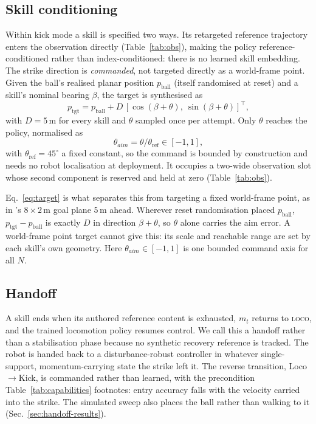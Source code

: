 \documentclass[letterpaper, 10 pt, conference]{ieeeconf}  %
\begin{document}
\subsection{Skill conditioning}

Within kick mode a skill is specified two ways. Its retargeted reference
trajectory enters the observation directly (Table~\ref{tab:obs}), making the
policy reference-conditioned rather than index-conditioned: there is no
learned skill embedding. The strike direction is \emph{commanded}, not
targeted directly as a world-frame point. Given the ball's realised planar
position $p_{\mathrm{ball}}$ (itself randomised at reset) and a skill's
nominal bearing $\beta$, the target is synthesised as
\begin{equation}
p_{\mathrm{tgt}} = p_{\mathrm{ball}} + D\,[\cos(\beta+\theta),\ \sin(\beta+\theta)]^\top,
\label{eq:target}
\end{equation}
with $D{=}5$\,m for every skill and $\theta$ sampled once per attempt. Only
$\theta$ reaches the policy, normalised as
\begin{equation}
\theta_{aim} = \theta / \theta_{\mathrm{ref}} \in [-1, 1],
\label{eq:aim}
\end{equation}
with $\theta_{\mathrm{ref}}{=}45^\circ$ a fixed constant, so the command is bounded by
construction and needs no robot localisation at deployment. It occupies a
two-wide observation slot whose second component is reserved and held at
zero (Table~\ref{tab:obs}).

Eq.~\ref{eq:target} is what separates this from targeting a fixed
world-frame point, as in \cite{robonaldo}'s $8\times2$\,m goal plane $5$\,m
ahead. Wherever reset randomisation placed $p_{\mathrm{ball}}$,
$p_{\mathrm{tgt}} - p_{\mathrm{ball}}$ is exactly $D$ in direction
$\beta+\theta$, so $\theta$ alone carries the aim error. A world-frame point
target cannot give this: its scale and reachable range are set by each skill's
own geometry. Here $\theta_{aim}\in[-1,1]$ is one bounded command axis for
all $N$.

\subsection{Handoff}

A skill ends when its authored reference content is exhausted, $m_t$ returns
to \textsc{loco}, and the trained locomotion policy resumes control. We call this a handoff rather than a stabilisation phase because no synthetic
recovery reference is tracked. The robot is handed back to a
disturbance-robust controller in whatever single-support, momentum-carrying
state the strike left it. The reverse transition,
Loco$\to$Kick, is commanded rather than learned, with the precondition
Table~\ref{tab:capabilities} footnotes: entry accuracy falls with the velocity
carried into the strike. The simulated sweep also places the ball rather than
walking to it (Sec.~\ref{sec:handoff-results}).
\end{document}
